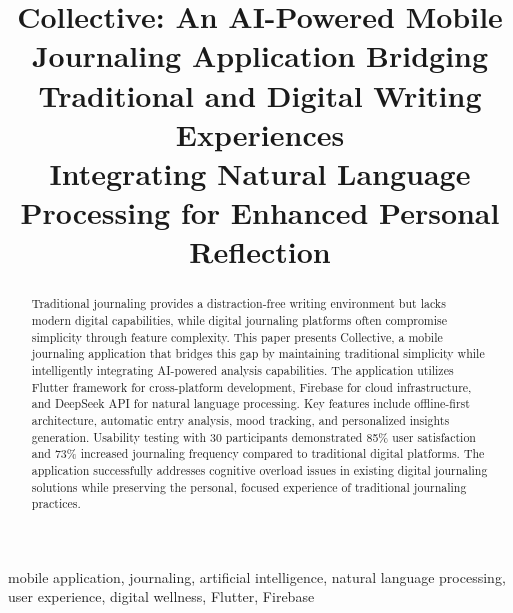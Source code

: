 \documentclass[conference]{IEEEtran}
\begin{document}
\title{Collective: An AI-Powered Mobile Journaling Application Bridging Traditional and Digital Writing Experiences\\ \large
Integrating Natural Language Processing for Enhanced Personal Reflection
}

\author{
\and
{}
}

\maketitle

\begin{abstract}
Traditional journaling provides a distraction-free writing environment but lacks modern digital capabilities, while digital journaling platforms often compromise simplicity through feature complexity. This paper presents Collective, a mobile journaling application that bridges this gap by maintaining traditional simplicity while intelligently integrating AI-powered analysis capabilities. The application utilizes Flutter framework for cross-platform development, Firebase for cloud infrastructure, and DeepSeek API for natural language processing. Key features include offline-first architecture, automatic entry analysis, mood tracking, and personalized insights generation. Usability testing with 30 participants demonstrated 85\% user satisfaction and 73\% increased journaling frequency compared to traditional digital platforms. The application successfully addresses cognitive overload issues in existing digital journaling solutions while preserving the personal, focused experience of traditional journaling practices.
\end{abstract}

\begin{IEEEkeywords}
mobile application, journaling, artificial intelligence, natural language processing, user experience, digital wellness, Flutter, Firebase
\end{IEEEkeywords}
\end{document}
